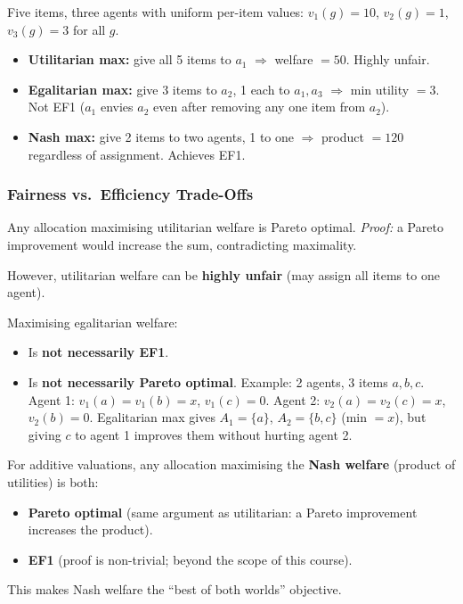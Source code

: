 \begin{exbox}
Five items, three agents with uniform per-item values: $v_1(g) = 10$, $v_2(g) = 1$, $v_3(g) = 3$ for all $g$.

\begin{itemize}
  \item \textbf{Utilitarian max:} give all 5 items to $a_1$ $\Rightarrow$ welfare $= 50$. Highly unfair.
  \item \textbf{Egalitarian max:} give 3 items to $a_2$, 1 each to $a_1, a_3$ $\Rightarrow$ min utility $= 3$. Not EF1 ($a_1$ envies $a_2$ even after removing any one item from $a_2$).
  \item \textbf{Nash max:} give 2 items to two agents, 1 to one $\Rightarrow$ product $= 120$ regardless of assignment. Achieves EF1.
\end{itemize}
\end{exbox}

\separator

\subsubsection{Fairness vs.\ Efficiency Trade-Offs}

\begin{thmbox}
Any allocation maximising utilitarian welfare is Pareto optimal. \emph{Proof:} a Pareto improvement would increase the sum, contradicting maximality.

However, utilitarian welfare can be \textbf{highly unfair} (may assign all items to one agent).
\end{thmbox}

\begin{thmbox}
Maximising egalitarian welfare:
\begin{itemize}
  \item Is \textbf{not necessarily EF1}.
  \item Is \textbf{not necessarily Pareto optimal}. Example: 2 agents, 3 items $a, b, c$. Agent 1: $v_1(a) = v_1(b) = x$, $v_1(c) = 0$. Agent 2: $v_2(a) = v_2(c) = x$, $v_2(b) = 0$. Egalitarian max gives $A_1 = \{a\}$, $A_2 = \{b, c\}$ (min $= x$), but giving $c$ to agent 1 improves them without hurting agent 2.
\end{itemize}
\end{thmbox}

\begin{thmbox}
For additive valuations, any allocation maximising the \textbf{Nash welfare} (product of utilities) is both:
\begin{itemize}
  \item \textbf{Pareto optimal} (same argument as utilitarian: a Pareto improvement increases the product).
  \item \textbf{EF1} (proof is non-trivial; beyond the scope of this course).
\end{itemize}
This makes Nash welfare the ``best of both worlds'' objective.
\end{thmbox}

